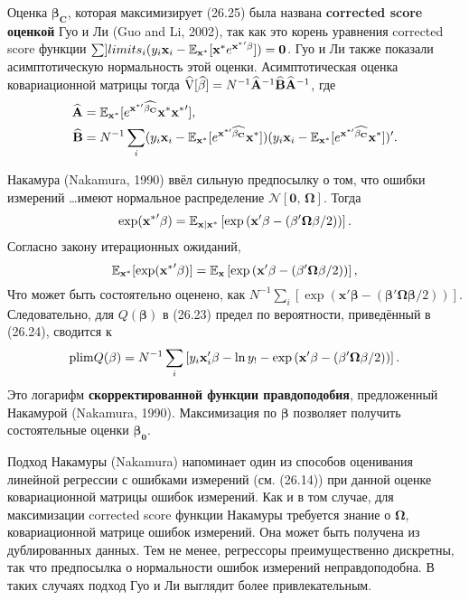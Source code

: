 Оценка $\mathbf{\beta_C}$, которая максимизирует (26.25) была названа {\bf corrected score оценкой} Гуо и Ли (Guo and Li, 2002), так как это корень уравнения corrected score функции $\sum ]limits_i (y_i \mathbf{x}_i- \mathbb{E}_{\mathbf{x^*}}[\mathbf{x^*}e^{\mathbf{x^*}'\mathbf{\beta}}])=\mathbf{0}$. Гуо и Ли также показали асимптотическую нормальность этой оценки. Асимптотическая оценка ковариационной матрицы тогда $\widehat{\mathrm{V}}[\widehat{\mathbf{\beta}}]=N^{-1} \widehat{\mathbf{A}}^{-1}\widehat{\mathbf{B}}\widehat{\mathbf{A}}^{-1}$, где 
\begin{align*}
\widehat{\mathbf{A}}&=\mathbb{E}_{\mathbf{x^*}}[e^{\mathbf{x}^{*\prime} \widehat{\mathbf{\beta_C}}} \mathbf{x^*} \mathbf{x^*}'], \\
\widehat{\mathbf{B}}&=N^{-1} \sum \limits_i (y_i \mathbf{x}_i - \mathbb{E}_{\mathbf{x^*}}[e^{\mathbf{x}^{*\prime} \widehat{\mathbf{\beta_C}}} \mathbf{x^*}]) (y_i \mathbf{x}_i - \mathbb{E}_{\mathbf{x^*}}[e^{\mathbf{x}^{*\prime} \widehat{\mathbf{\beta_C}}} \mathbf{x^*}])'.
\end{align*}

Накамура (Nakamura, 1990) ввёл сильную предпосылку о том, что ошибки измерений \ldots имеют нормальное распределение $\mathcal{N}[\mathbf{0}, \, \mathbf{\Omega}]$. Тогда
\[
\exp (\mathbf{x^*}' \mathbf{\beta}) = \mathbb{E}_{\mathbf{x|x^*}} \left[ \exp \left(\mathbf{x}' \mathbf{\beta} - (\mathbf{\beta' \Omega \beta} /2) \right) \right].
\]
Согласно закону итерационных ожиданий,
\[
\mathbb{E}_{\mathbf{x^*}} [\exp (\mathbf{x^*}' \mathbf{\beta})] = \mathbb{E}_{\mathbf{x}} \left[ \exp \left(\mathbf{x}' \mathbf{\beta} - (\mathbf{\beta' \Omega \beta} /2) \right) \right],
\]
Что может быть состоятельно оценено, как $N^{-1} \sum \limits_i [ \exp (\mathbf{x}' \mathbf{\beta} - (\mathbf{\beta' \Omega \beta} /2) )]$. Следовательно, для $Q(\mathbf{\beta})$ в (26.23) предел по вероятности, приведённый в (26.24), сводится к
\[
\mathrm{plim } Q(\mathbf{\beta}) = N^{-1} \sum \limits_i \left[ y_i \mathbf{x}'_i \mathbf{\beta} - \ln y_! - \exp \left(\mathbf{x}' \mathbf{\beta} - (\mathbf{\beta' \Omega \beta} /2) \right) \right].
\]
Это логарифм {\bf скорректированной функции правдоподобия}, предложенный Накамурой (Nakamura, 1990). Максимизация по $\mathbf{\beta}$ позволяет получить состоятельные оценки $\mathbf{\beta_0}$.

Подход Накамуры (Nakamura) напоминает один из способов оценивания линейной регрессии с ошибками измерений (см. (26.14)) при данной оценке ковариационной матрицы ошибок измерений. Как и в том случае, для максимизации corrected score функции Накамуры требуется знание о $\mathbf{\Omega}$, ковариационной матрице ошибок измерений. Она может быть получена из дублированных данных. Тем не менее, регрессоры преимущественно дискретны, так что предпосылка о нормальности ошибок измерений неправдоподобна. В таких случаях подход Гуо и Ли выглядит более привлекательным.

